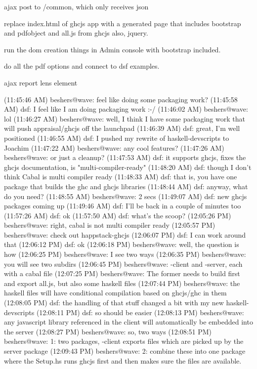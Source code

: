 ajax post to /common, which only receives json


replace index.html of ghcjs app with a generated page that includes bootstrap and pdfobject and all.js from ghcjs
also, jquery.

run the dom creation things in Admin console with bootstrap included.

do all the pdf options and connect to dsf examples.

ajax report lens element


(11:45:46 AM) beshers@wave: feel like doing some packaging work?
(11:45:58 AM) dsf: I feel like I am doing packaging work :-/
(11:46:02 AM) beshers@wave: lol
(11:46:27 AM) beshers@wave: well, I think I have some packaging work that will push appraisal/ghcjs off the launchpad
(11:46:39 AM) dsf: great, I'm well positioned
(11:46:55 AM) dsf: I pushed my rewrite of haskell-devscripts to Joachim
(11:47:22 AM) beshers@wave: any cool features?
(11:47:26 AM) beshers@wave: or just a cleanup?
(11:47:53 AM) dsf: it supports ghcjs, fixes the ghcjs documentation, is "multi-compiler-ready"
(11:48:20 AM) dsf: though I don't think Cabal is multi compiler ready
(11:48:33 AM) dsf: that is, you have one package that builds the ghc and ghcjs libraries
(11:48:44 AM) dsf: anyway, what do you need?
(11:48:55 AM) beshers@wave: 2 secs
(11:49:07 AM) dsf: new ghcjs packages coming up
(11:49:46 AM) dsf: I'll be back in a couple of minutes too
(11:57:26 AM) dsf: ok
(11:57:50 AM) dsf: what's the scoop?
(12:05:26 PM) beshers@wave: right, cabal is not multi compiler ready
(12:05:57 PM) beshers@wave: check out happstack-ghcjs
(12:06:07 PM) dsf: I can work around that
(12:06:12 PM) dsf: ok
(12:06:18 PM) beshers@wave: well, the question is how
(12:06:25 PM) beshers@wave: I see two ways
(12:06:35 PM) beshers@wave: you will see two subdirs
(12:06:45 PM) beshers@wave: -client and -server, each with a cabal file
(12:07:25 PM) beshers@wave: The former needs to build first and export    all.js, but also some haskell files
(12:07:44 PM) beshers@wave: the haskell files will have conditional compilation based on ghcjs/ghc in them
(12:08:05 PM) dsf: the handling of that stuff changed a bit with my new haskell-devscripts
(12:08:11 PM) dsf: so should be easier
(12:08:13 PM) beshers@wave: any javascript library referenced in the client will automatically be embedded into the server
(12:08:27 PM) beshers@wave: so, two ways
(12:08:51 PM) beshers@wave: 1:  two packages, -client exports files which are picked up by the server package
(12:09:43 PM) beshers@wave: 2:  combine these into one package where the Setup.hs runs ghcjs first and then makes sure the files are available.
